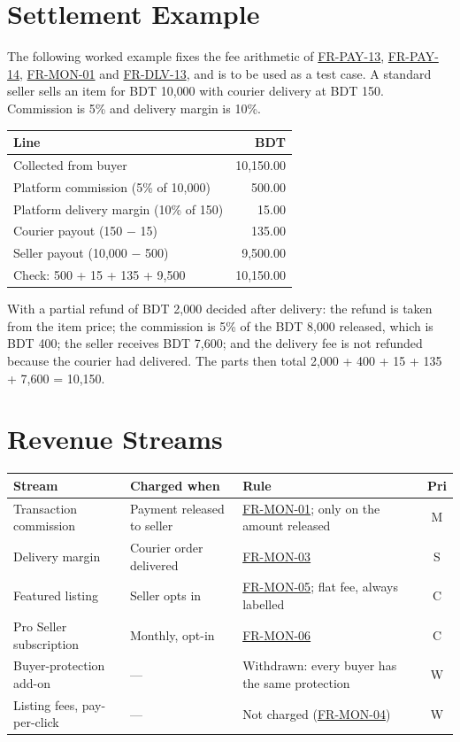 \documentclass[11pt,a4paper]{report}
\newcommand{\rr}[1]{\hyperlink{#1}{#1}}
\begin{document}
\section{Settlement Example}
The following worked example fixes the fee arithmetic of \rr{FR-PAY-13}, \rr{FR-PAY-14}, \rr{FR-MON-01} and \rr{FR-DLV-13}, and is to be used as a test case. A standard seller sells an item for BDT 10{,}000 with courier delivery at BDT 150. Commission is 5\% and delivery margin is 10\%.
\begin{center}
\small
\begin{tabular}{@{}l r@{}}
\toprule
\textbf{Line} & \textbf{BDT} \\
\midrule
Collected from buyer & 10{,}150.00 \\
Platform commission (5\% of 10{,}000) & 500.00 \\
Platform delivery margin (10\% of 150) & 15.00 \\
Courier payout (150 $-$ 15) & 135.00 \\
Seller payout (10{,}000 $-$ 500) & 9{,}500.00 \\
\midrule
Check: 500 + 15 + 135 + 9{,}500 & 10{,}150.00 \\
\bottomrule
\end{tabular}
\end{center}
With a partial refund of BDT 2{,}000 decided after delivery: the refund is taken from the item price; the commission is 5\% of the BDT 8{,}000 released, which is BDT 400; the seller receives BDT 7{,}600; and the delivery fee is not refunded because the courier had delivered. The parts then total 2{,}000 + 400 + 15 + 135 + 7{,}600 = 10{,}150.

\section{Revenue Streams}
\begin{center}
\small
\begin{tabularx}{\textwidth}{@{}>{\raggedright\arraybackslash}p{3.4cm} >{\raggedright\arraybackslash}p{3.4cm} X c@{}}
\toprule
\textbf{Stream} & \textbf{Charged when} & \textbf{Rule} & \textbf{Pri} \\
\midrule
Transaction commission & Payment released to seller & \rr{FR-MON-01}; only on the amount released & M \\
Delivery margin & Courier order delivered & \rr{FR-MON-03} & S \\
Featured listing & Seller opts in & \rr{FR-MON-05}; flat fee, always labelled & C \\
Pro Seller subscription & Monthly, opt-in & \rr{FR-MON-06} & C \\
Buyer-protection add-on & --- & Withdrawn: every buyer has the same protection & W \\
Listing fees, pay-per-click & --- & Not charged (\rr{FR-MON-04}) & W \\
\bottomrule
\end{tabularx}
\end{center}
\appendix
\end{document}
